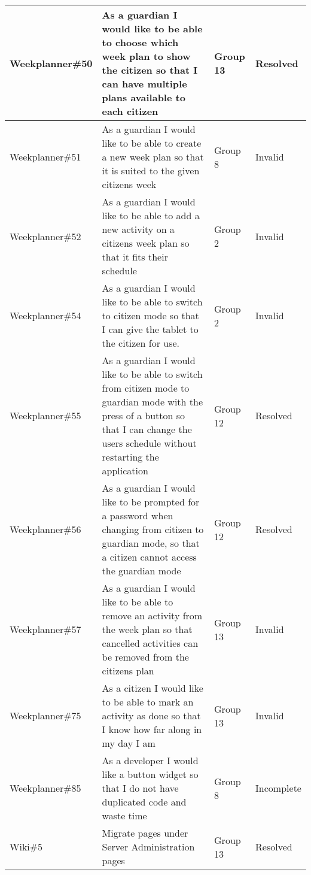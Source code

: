 \begin{longtable}{|p{2.8cm}|p{7cm}|p{1.5cm}|p{1.4cm}|}
    Weekplanner\#50 & As a guardian I would like to be able to choose which week plan to show the citizen so that I can have multiple plans available to each citizen                                          & Group 13        & Resolved\\ \hline
    Weekplanner\#51 & As a guardian I would like to be able to create a new week plan so that it is suited to the given citizens week                                                                          & Group 8         & Invalid    \\ \hline
    Weekplanner\#52 & As a guardian I would like to be able to add a new activity on a citizens week plan so that it fits their schedule                                                                       & Group 2         & Invalid    \\ \hline
    Weekplanner\#54 & As a guardian I would like to be able to switch to citizen mode so that I can give the tablet to the citizen for use.                                                                    & Group 2         & Invalid    \\ \hline
    Weekplanner\#55 & As a guardian I would like to be able to switch from citizen mode to guardian mode with the press of a button so that I can change the users schedule without restarting the application & Group 12        & Resolved    \\ \hline
    Weekplanner\#56 & As a guardian I would like to be prompted for a password when changing from citizen to guardian mode, so that a citizen cannot access the guardian mode                                  & Group 12        & Resolved    \\ \hline
    Weekplanner\#57 & As a guardian I would like to be able to remove an activity from the week plan so that cancelled activities can be removed from the citizens plan                                        & Group 13        & Invalid    \\ \hline
    Weekplanner\#75 & As a citizen I would like to be able to mark an activity as done so that I know how far along in my day I am                                                                             & Group 13        & Invalid    \\ \hline
    Weekplanner\#85 & As a developer I would like a button widget so that I do not have duplicated code and waste time                                                                                         & Group 8         & Incomplete    \\ \hline
    Wiki\#5         & Migrate pages under Server Administration pages                                                                                                                                          & Group 13        & Resolved    \\ \hline

\end{longtable}
